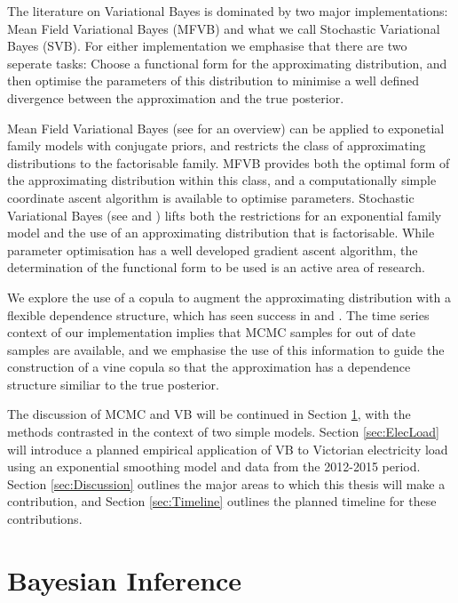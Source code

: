 \documentclass[12pt,a4paper]{article}%
\numberwithin{equation}{section}
\begin{document}
The literature on Variational Bayes is dominated by two major implementations: Mean Field Variational Bayes (MFVB) and what we call Stochastic Variational Bayes (SVB). For either implementation we emphasise that there are two seperate tasks: Choose a functional form for the approximating distribution, and then optimise the parameters of this distribution to minimise a well defined divergence between the approximation and the true posterior. 

Mean Field Variational Bayes (see \citet{Bishop2006} for an overview) can be applied to exponetial family models with conjugate priors, and restricts the class of approximating distributions to the factorisable family. MFVB provides both the optimal form of the approximating distribution within this class, and a computationally simple coordinate ascent algorithm is available to optimise parameters.
Stochastic Variational Bayes (see \citet{Paisley2012} and \citet{Ranganath2014}) lifts both the restrictions for an exponential family model and the use of an approximating distribution that is factorisable. While parameter optimisation has a well developed gradient ascent algorithm, the determination of the functional form to be used is an active area of research.

We explore the use of a copula to augment the approximating distribution with a flexible dependence structure, which has seen success in \citet{Tran2015} and \citet{Ng2016}. The time series context of our implementation implies that MCMC samples for out of date samples are available, and we emphasise the use of this information to guide the construction of a vine copula so that the approximation has a dependence structure similiar to the true posterior. 

The discussion of MCMC and VB will be continued in Section \ref{sec:BayesInf}, with the methods contrasted in the context of two simple models. Section \ref{sec:ElecLoad} will introduce a planned empirical application of VB to Victorian electricity load using an exponential smoothing model and data from the 2012-2015 period. Section \ref{sec:Discussion} outlines the major areas to which this thesis will make a contribution, and Section \ref{sec:Timeline} outlines the planned timeline for these contributions.

\section{Bayesian Inference} \label{sec:BayesInf}
\end{document}
